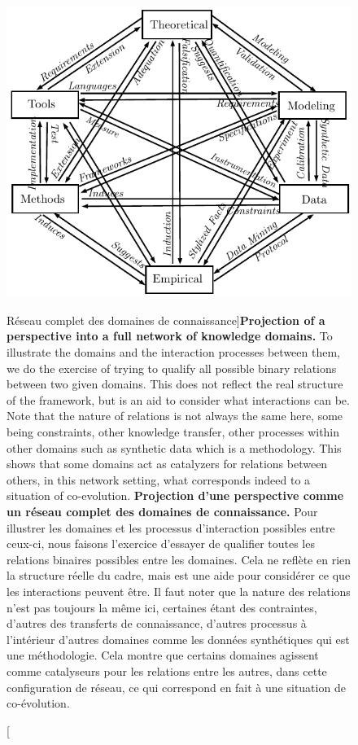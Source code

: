 \begin{figure}[h!]
\centering
\includegraphics[width=\textwidth]{Figures/KnowledgeFramework/framework}
\caption[Full network of knowledge domains][Réseau complet des domaines de connaissance]{\textbf{Projection of a perspective into a full network of knowledge domains.} To illustrate the domains and the interaction processes between them, we do the exercise of trying to qualify all possible binary relations between two given domains. This does not reflect the real structure of the framework, but is an aid to consider what interactions can be. Note that the nature of relations is not always the same here, some being constraints, other knowledge transfer, other processes within other domains such as synthetic data which is a methodology. This shows that some domains act as catalyzers for relations between others, in this network setting, what corresponds indeed to a situation of co-evolution.
}{\textbf{Projection d'une perspective comme un réseau complet des domaines de connaissance.} Pour illustrer les domaines et les processus d'interaction possibles entre ceux-ci, nous faisons l'exercice d'essayer de qualifier toutes les relations binaires possibles entre les domaines. Cela ne reflète en rien la structure réelle du cadre, mais est une aide pour considérer ce que les interactions peuvent être. Il faut noter que la nature des relations n'est pas toujours la même ici, certaines étant des contraintes, d'autres des transferts de connaissance, d'autres processus à l'intérieur d'autres domaines comme les données synthétiques qui est une méthodologie. Cela montre que certains domaines agissent comme catalyseurs pour les relations entre les autres, dans cette configuration de réseau, ce qui correspond en fait à une situation de co-évolution.}
\label{fig:knowledgeframework:fwk}
\end{figure}




